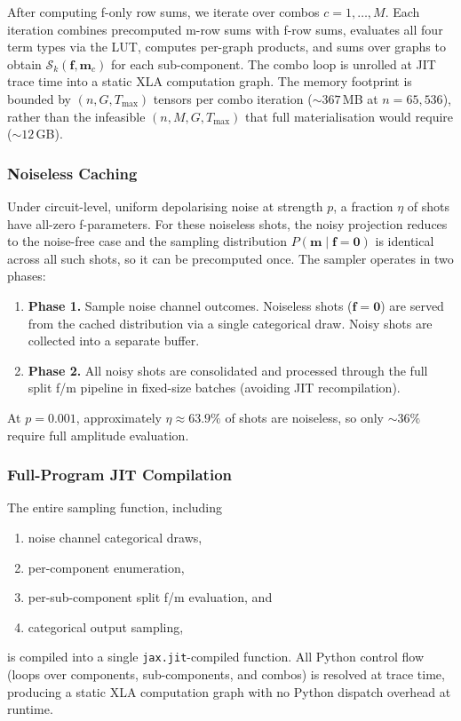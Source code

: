 \documentclass[a4paper,onecolumn,11pt,accepted=2026-06-10]{quantumarticle}
\begin{document}
After computing f-only row sums, we iterate over combos $c = 1, \ldots, M$. Each iteration combines precomputed m-row sums with f-row sums, evaluates all four term types via the LUT, computes per-graph products, and sums over graphs to obtain $\mathcal{S}_k(\mathbf{f}, \mathbf{m}_c)$ for each sub-component. The combo loop is unrolled at JIT trace time into a static XLA computation graph. The memory footprint is bounded by $(n, G, T_{\max})$ tensors per combo iteration (${\sim}367$\,MB at $n = 65{,}536$), rather than the infeasible $(n, M, G, T_{\max})$ that full materialisation would require (${\sim}12$\,GB).

\subsubsection{Noiseless Caching}
\label{sec:noiseless-cache}

Under circuit-level, uniform depolarising noise at strength $p$, a fraction $\eta$ of shots have all-zero f-parameters. For these noiseless shots, the noisy projection reduces to the noise-free case and the sampling distribution
$P(\mathbf{m} \mid \mathbf{f} = \mathbf{0})$ is identical across all such
shots, so it can be precomputed once. The sampler operates in two phases:
\begin{enumerate}
    \item \textbf{Phase 1.} Sample noise channel outcomes. Noiseless shots
          ($\mathbf{f} = \mathbf{0}$) are served from the cached distribution
          via a single categorical draw. Noisy shots are collected into a
          separate buffer.
    \item \textbf{Phase 2.} All noisy shots are consolidated and processed
          through the full split f/m pipeline in fixed-size batches (avoiding
          JIT recompilation).
\end{enumerate}
At $p = 0.001$, approximately $\eta \approx 63.9\%$ of shots are noiseless, so only ${\sim}36\%$ require full amplitude evaluation.

\subsubsection{Full-Program JIT Compilation}
\label{sec:jit}

The entire sampling function, including 
\begin{enumerate}
    \item noise channel categorical draws, 
    \item per-component enumeration, 
    \item per-sub-component split f/m evaluation, and 
    \item categorical output sampling, 
\end{enumerate}
is compiled into a single \texttt{jax.jit}-compiled function. All Python control flow (loops over components, sub-components, and combos) is resolved at trace time, producing a static XLA computation graph with no Python dispatch overhead at runtime.
\end{document}
